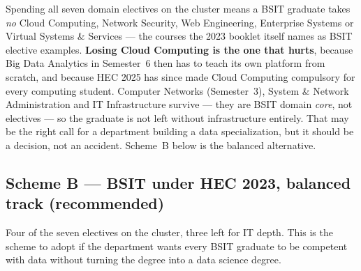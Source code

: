 \documentclass[11pt,a4paper,oneside]{report}
\begin{document}
\begin{warnbox}
Spending all seven domain electives on the cluster means a BSIT graduate takes
\emph{no} Cloud Computing, Network Security, Web Engineering, Enterprise Systems
or Virtual Systems \& Services --- the courses the 2023 booklet itself names as
BSIT elective examples. \textbf{Losing Cloud Computing is the one that hurts},
because Big Data Analytics in Semester~6 then has to teach its own platform from
scratch, and because HEC 2025 has since made Cloud Computing compulsory for every
computing student. Computer Networks (Semester~3), System \& Network
Administration and IT Infrastructure survive --- they are BSIT domain \emph{core},
not electives --- so the graduate is not left without infrastructure entirely.
That may be the right call for a department building a data specialization, but it
should be a decision, not an accident. Scheme~B below is the balanced alternative.
\end{warnbox}

\subsection{Scheme B --- BSIT under HEC 2023, balanced track (recommended)}

Four of the seven electives on the cluster, three left for IT depth. This is the
scheme to adopt if the department wants every BSIT graduate to be competent with
data without turning the degree into a data science degree.
\end{document}
